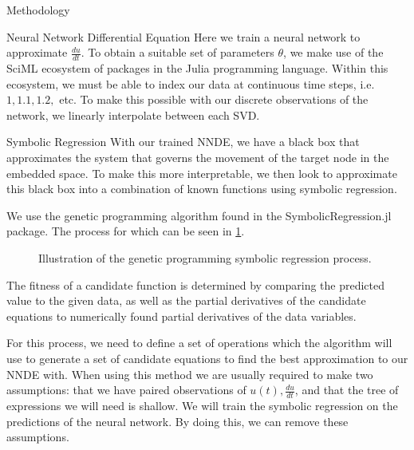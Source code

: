 \documentclass[12pt]{amsbook}
\begin{document}
\begin{chapter}{Methodology}
\begin{section}{Neural Network Differential Equation}
        Here we train a neural network to approximate $\frac{du}{dt}$. To obtain a suitable set of parameters $\theta$, we make use of the SciML ecosystem\cite{SciML_C_Rak} of packages in the Julia programming language. Within this ecosystem, we must be able to index our data at continuous time steps, i.e. $1, 1.1, 1.2,$ etc. To make this possible with our discrete observations of the network, we linearly interpolate between each SVD.
    \end{section}


    
    \begin{section}{Symbolic Regression}
        With our trained NNDE, we have a black box that approximates the system that governs the movement of the target node in the embedded space. To make this more interpretable, we then look to approximate this black box into a combination of known functions using symbolic regression\cite{pysr}.
        
        We use the genetic programming algorithm found in the SymbolicRegression.jl\cite{pysr} package. The process for which can be seen in \cref{symbreg}.

        \begin{figure}
            \centering
            \resizebox{\width}{!}{}
            \caption{Illustration of the genetic programming symbolic regression process.}
            \label{symbreg}
        \end{figure}
        
        The fitness of a candidate function is determined by comparing the predicted value to the given data, as well as the partial derivatives of the candidate equations to numerically found partial derivatives of the data variables.

        For this process, we need to define a set of operations which the algorithm will use to generate a set of candidate equations to find the best approximation to our NNDE with. When using this method we are usually required to make two assumptions: that we have paired observations of $u(t), \frac{du}{dt}$, and that the tree of expressions we will need is shallow. We will train the symbolic regression on the predictions of the neural network. By doing this, we can remove these assumptions\cite{kidger2022neural}.
    \end{section}


\end{chapter}
\end{document}
